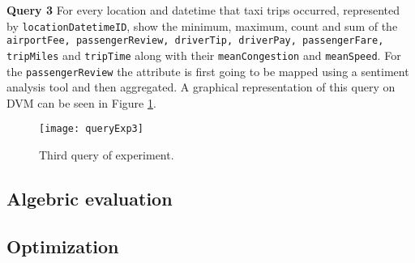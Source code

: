 \textbf{Query 3} For every location and datetime that taxi trips occurred, represented by \texttt{locationDatetimeID}, show the minimum, maximum, count and sum of the \texttt{airportFee, passengerReview, driverTip, driverPay, passengerFare, tripMiles} and \texttt{tripTime} along with their \texttt{meanCongestion} and \texttt{meanSpeed}. For the \texttt{passengerReview} the attribute is first going to be mapped using a sentiment analysis tool and then aggregated. A graphical representation of this query on DVM can be seen in Figure \ref{queryExp3}.

\begin{center}
    \begin{figure}[h]
        \texttt{[image: queryExp3]}
        \caption{Third query of experiment.}
        \label{queryExp3}
    \end{figure}
\end{center}

\subsection{Algebric evaluation}

\subsection{Optimization}